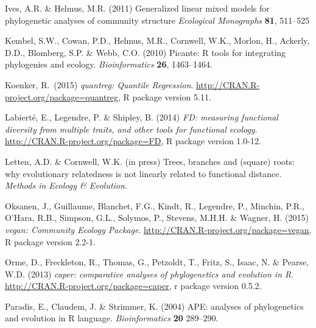 \documentclass{bioinfo}
\begin{document}
\begin{thebibliography}{30}
Ives, A.R. \&
  Helmus, M.R. (2011) Generalized linear mixed models for phylogenetic
  analyses of community structure \emph{Ecological Monographs}
  \textbf{81}, 511--525

Kembel, S.W., Cowan, P.D., Helmus, M.R., Cornwell, W.K., Morlon, H., Ackerly,
  D.D., Blomberg, S.P. \& Webb, C.O. (2010) Picante: R tools for integrating
  phylogenies and ecology. \emph{Bioinformatics} \textbf{26}, 1463--1464.

 Koenker, R.\ (2015)
  \emph{quantreg: Quantile
    Regression}. \urlprefix\url{http://CRAN.R-project.org/package=quantreg},
  R package version 5.11.

 Labiert\'{e}, E., Legendre,
  P. \& Shipley, B. (2014) \emph{FD: measuring functional diversity
    from multiple traits, and other tools for functional
    ecology}. \urlprefix\url{http://CRAN.R-project.org/package=FD}, R
  package version 1.0-12.

 Letten, A.D. \& Cornwell, W.K. (in press)
  Trees, branches and (square) roots: why evolutionary relatedness is
  not linearly related to functional distance. \emph{Methods in
    Ecology \& Evolution}.

 Oksanen, J., Guillaume, Blanchet, F.G., Kindt,
R., Legendre, P., Minchin, P.R., O'Hara, R.B., Simpson, G.L., Solymos,
P., Stevens, M.H.H. \& Wagner, H. (2015) \emph{vegan: Community Ecology
  Package}. \urlprefix\url{http://CRAN.R-project.org/package=vegan}, R
package version 2.2-1.

Orme, D., Freckleton, R., Thomas, G., Petzoldt, T., Fritz, S., Isaac, N. \&
  Pearse, W.D. (2013) \emph{caper: comparative analyses of phylogenetics and
  evolution in {R}}. \urlprefix\url{http://CRAN.R-project.org/package=caper}, r
  package version 0.5.2.

 Paradis, E., Claudem, J. \& Strimmer, K.
  (2004) APE: analyses of phylogenetics and evolution in R
  language. \emph{Bioinformatics} \textbf{20} 289--290.


\end{thebibliography}
\end{document}
